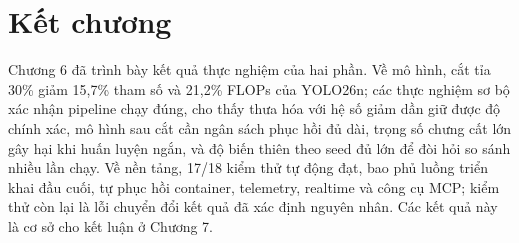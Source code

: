 \section{Kết chương}

Chương 6 đã trình bày kết quả thực nghiệm của hai phần. Về mô hình, cắt tỉa
30\% giảm 15,7\% tham số và 21,2\% FLOPs của YOLO26n; các thực nghiệm sơ bộ xác
nhận pipeline chạy đúng, cho thấy thưa hóa với hệ số giảm dần giữ được độ chính
xác, mô hình sau cắt cần ngân sách phục hồi đủ dài, trọng số chưng cất lớn gây hại
khi huấn luyện ngắn, và độ biến thiên theo seed đủ lớn để đòi hỏi so sánh nhiều
lần chạy. Về nền tảng, 17/18 kiểm thử tự động đạt, bao phủ luồng triển khai đầu
cuối, tự phục hồi container, telemetry, realtime và công cụ MCP; kiểm thử còn lại
là lỗi chuyển đổi kết quả đã xác định nguyên nhân. Các kết quả này là cơ sở cho
kết luận ở Chương 7.
